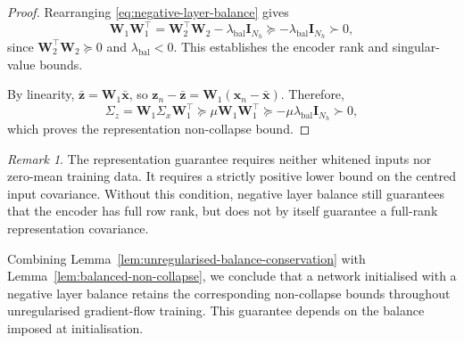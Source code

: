 \documentclass{article} %
\newcommand{\wa}{\mathbf{W}_1}
\newcommand{\wb}{\mathbf{W}_2}
\newtheorem{lemma}[theorem]{Lemma}
\theoremstyle{remark}
\newtheorem{remark}[theorem]{Remark}
\begin{document}
\begin{proof}
Rearranging \eqref{eq:negative-layer-balance} gives
\[
\wa\wa^\top
=
\wb^\top\wb-\lambda_{\mathrm{bal}}\mathbf{I}_{N_h}
\succeq
-\lambda_{\mathrm{bal}}\mathbf{I}_{N_h}
\succ0,
\]
since $\wb^\top\wb\succeq0$ and $\lambda_{\mathrm{bal}}<0$.
This establishes the encoder rank and singular-value bounds.

By linearity, $\bar{\mathbf{z}}=\wa\bar{\mathbf{x}}$, so
$\mathbf{z}_n-\bar{\mathbf{z}}
=\wa(\mathbf{x}_n-\bar{\mathbf{x}})$.
Therefore,
\[
\Sigma_z
=
\wa\Sigma_x\wa^\top
\succeq
\mu\wa\wa^\top
\succeq
-\mu\lambda_{\mathrm{bal}}\mathbf{I}_{N_h}
\succ0,
\]
which proves the representation non-collapse bound.
\end{proof}

\begin{remark}
The representation guarantee requires neither whitened inputs nor
zero-mean training data. It requires a strictly positive lower bound
on the centred input covariance. Without this condition, negative
layer balance still guarantees that the encoder has full row rank,
but does not by itself guarantee a full-rank representation covariance.
\end{remark}

Combining Lemma~\ref{lem:unregularised-balance-conservation} with
Lemma~\ref{lem:balanced-non-collapse}, we conclude that a network
initialised with a negative layer balance retains the corresponding
non-collapse bounds throughout unregularised gradient-flow training.
This guarantee depends on the balance imposed at initialisation.




\end{document}
